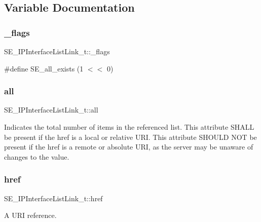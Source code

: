 \subsection{Variable Documentation}
\mbox{\label{group__IPInterfaceListLink_gadec76351c50ca25f3c436f8a5c034110}} 
\subsubsection{\texorpdfstring{\+\_\+flags}{\_flags}}
{\footnotesize\ttfamily S\+E\+\_\+\+I\+P\+Interface\+List\+Link\+\_\+t\+::\+\_\+flags}

\#define S\+E\+\_\+all\+\_\+exists (1 $<$$<$ 0) \mbox{\label{group__IPInterfaceListLink_ga4f3744f432c05a0c9abe6120b6661fc6}} 
\subsubsection{\texorpdfstring{all}{all}}
{\footnotesize\ttfamily S\+E\+\_\+\+I\+P\+Interface\+List\+Link\+\_\+t\+::all}

Indicates the total number of items in the referenced list. This attribute S\+H\+A\+LL be present if the href is a local or relative U\+RI. This attribute S\+H\+O\+U\+LD N\+OT be present if the href is a remote or absolute U\+RI, as the server may be unaware of changes to the value. \mbox{\label{group__IPInterfaceListLink_ga2e91acf15facca125f3e17b33e429b70}} 
\subsubsection{\texorpdfstring{href}{href}}
{\footnotesize\ttfamily S\+E\+\_\+\+I\+P\+Interface\+List\+Link\+\_\+t\+::href}

A U\+RI reference. 